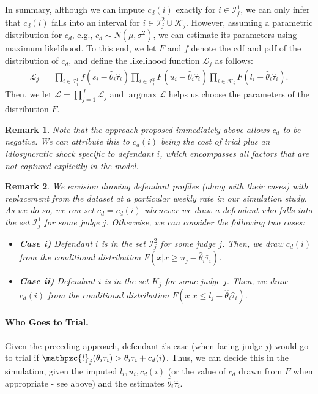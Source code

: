 \documentclass[11pt, oneside]{article}   	%
\theoremstyle{ModifiedStyle}
\newtheorem{remark}{Remark}
\DeclareMathOperator*{\argmax}{argmax}
\begin{document}
In summary, although we can impute $c_d(i)$ exactly for $i\in\mathcal{I}_j^1$, we can only infer that $c_d(i)$ falls into an interval for $i\in\mathcal{I}^2_j\cup \mathcal{K}_j$. However, assuming a parametric distribution for $c_d$, e.g., $c_d \sim N(\mu,\sigma^2)$, we can estimate its parameters using maximum likelihood. To this end, we let $F$ and $f$ denote the cdf and pdf of the distribution of $c_d$, and define the likelihood function $\mathscr{L}_j$ as follows:
\begin{align*}
	\mathscr{L}_j \,=\, \prod_{i\in\mathcal{I}_j^1} f(s_i-\hat{\theta}_i\hat{\tau}_i) \prod_{i\in\mathcal{I}_j^2} \bar{F}(u_i-\hat{\theta}_i\hat{\tau}_i) \prod_{i\in \mathcal{K}_j} F(l_i-\hat{\theta}_i\hat{\tau}_i).
\end{align*}
Then, we let $\mathscr{L} = \prod_{j=1}^J \mathscr{L}_j$ and $\argmax \mathscr{L}$ helps us choose the parameters of the distribution $F$.
\begin{remark}
	Note that the approach proposed immediately above allows $c_d$ to be negative. We can attribute this to $c_d(i)$ being the cost of trial plus an idiosyncratic shock specific to defendant $i$, which encompasses all factors that are not captured explicitly in the model.
\end{remark}
\begin{remark}
	We envision drawing defendant profiles (along with their cases) with replacement from the dataset at a particular weekly rate in our simulation study. As we do so, we can set $c_d = c_d(i)$ whenever we draw a defendant who falls into the set $\mathcal{I}_j^1$ for some judge $j$. Otherwise, we can consider the following two cases:
	\begin{itemize}
		\vspace{-2mm}
		\item[] \hspace{-10mm}\textbf{Case i)} Defendant $i$ is in the set $\mathcal{I}_j^2$ for some judge $j$. Then, we draw $c_d(i)$ from the conditional distribution $F(x|x\geq u_j-\hat{\theta}_i\hat{\tau}_i)$.
		\vspace{-2mm}
		\item[] \hspace{-10mm}\textbf{Case ii)} Defendant $i$ is in the set $K_j$ for some judge $j$. Then, we draw $c_d(i)$ from the conditional distribution $F(x|x\leq l_j-\hat{\theta}_i\hat{\tau}_i)$.
	\end{itemize}
\end{remark}
%
\vspace{-3mm}
\paragraph{Who Goes to Trial.} Given the preceding approach, defendant $i$'s case (when facing judge $j$) would go to trial if $\mathpzc{l}_j(\theta_i\tau_i) > \theta_i\tau_i + c_d(i)$. Thus, we can decide this in the simulation, given the imputed $l_i,u_i,c_d(i)$ (or the value of $c_d$ drawn from $F$ when appropriate - see above) and the estimates $\hat{\theta}_i\hat{\tau}_i$.
\end{document}
